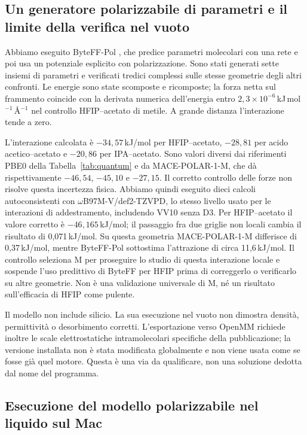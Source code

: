 \documentclass[11pt,reqno]{amsart}
\numberwithin{equation}{section}
\begin{document}
\subsection{Un generatore polarizzabile di parametri e il limite della verifica nel vuoto}

Abbiamo eseguito ByteFF-Pol \cite{ByteFFPol2026}, che predice
parametri molecolari con una rete e poi usa un potenziale esplicito
con polarizzazione. Sono stati generati sette insiemi di parametri
e verificati tredici complessi sulle stesse geometrie degli altri
confronti. Le energie sono state scomposte e ricomposte;
la forza netta sul frammento coincide con la derivata numerica
dell'energia entro $2,3\times10^{-6}$\,kJ\,mol$^{-1}$\,\AA$^{-1}$
nel controllo HFIP--acetato di metile. A grande distanza
l'interazione tende a zero.

L'interazione calcolata \`e $-34,57$\,kJ/mol per HFIP--acetato,
$-28,81$ per acido acetico--acetato e $-20,86$ per IPA--acetato.
Sono valori diversi dai riferimenti PBE0 della Tabella~\ref{tab:quantum}
e da MACE-POLAR-1-M, che d\`a rispettivamente $-46,54$, $-45,10$
e $-27,15$. Il corretto controllo delle forze non risolve
questa incertezza fisica. Abbiamo quindi eseguito dieci calcoli
autoconsistenti con $\omega$B97M-V/def2-TZVPD, lo stesso livello
usato per le interazioni di addestramento, includendo VV10 senza D3.
Per HFIP--acetato il valore corretto \`e $-46,165$\,kJ/mol;
il passaggio fra due griglie non locali cambia il risultato
di 0,071\,kJ/mol. Su questa geometria MACE-POLAR-1-M differisce
di 0,37\,kJ/mol, mentre ByteFF-Pol sottostima l'attrazione
di circa 11,6\,kJ/mol. Il controllo seleziona M per proseguire
lo studio di questa interazione locale e sospende l'uso predittivo
di ByteFF per HFIP prima di correggerlo o verificarlo su altre
geometrie. Non \`e una validazione universale di M, n\'e
un risultato sull'efficacia di HFIP come pulente.

Il modello non include silicio. La sua esecuzione nel vuoto
non dimostra densit\`a, permittivit\`a o desorbimento corretti.
L'esportazione verso OpenMM richiede inoltre le scale elettrostatiche
intramolecolari specifiche della pubblicazione; la versione installata
non \`e stata modificata globalmente e non viene usata come
se fosse gi\`a quel motore. Questa \`e una via da qualificare,
non una soluzione dedotta dal nome del programma.

\subsection{Esecuzione del modello polarizzabile nel liquido sul Mac}
\end{document}
